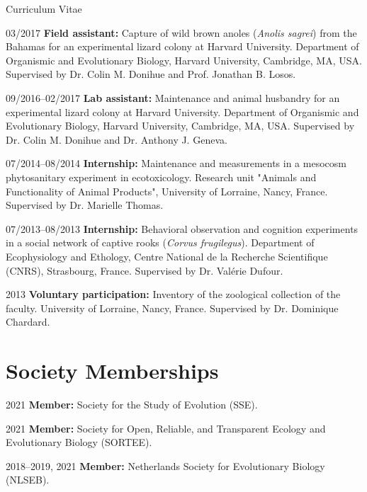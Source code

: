 \documentclass[11pt,a4paper]{article}
\begin{document}
\begin{cv}{Curriculum Vitae}
\begin{cvlist}{}
			\item[03/2017] \textbf{Field assistant:} Capture of wild brown anoles (\textit{Anolis sagrei}) from the Bahamas for an experimental lizard colony at Harvard University. Department of Organismic and Evolutionary Biology, Harvard University, Cambridge, MA, USA. Supervised by Dr. Colin M. Donihue and Prof. Jonathan B. Losos.
		
			\item[09/2016--02/2017] \textbf{Lab assistant:} Maintenance and animal husbandry for an experimental lizard colony at Harvard University. Department of Organismic and Evolutionary Biology, Harvard University, Cambridge, MA, USA. Supervised by Dr. Colin M. Donihue and Dr. Anthony J. Geneva.
		
			\item[07/2014--08/2014] \textbf{Internship:} Maintenance and measurements in a mesocosm phytosanitary experiment in ecotoxicology. Research unit "Animals and Functionality of Animal Products", University of Lorraine, Nancy, France. Supervised by Dr. Marielle Thomas.
		
			\item[07/2013--08/2013] \textbf{Internship:} Behavioral observation and cognition experiments in a social network of captive rooks (\textit{Corvus frugilegus}). Department of Ecophysiology and Ethology, Centre National de la Recherche Scientifique (CNRS), Strasbourg, France. Supervised by Dr. Valérie Dufour.
		
			\item[2013] \textbf{Voluntary participation:} Inventory of the zoological collection of the faculty. University of Lorraine, Nancy, France. Supervised by Dr. Dominique Chardard.
		
		\end{cvlist}
		
		\section{Society Memberships}
		
		\begin{cvlist}{}
			
			\item[2021] \textbf{Member:} Society for the Study of Evolution (SSE). 
			
			\item[2021] \textbf{Member:} Society for Open, Reliable, and Transparent Ecology and Evolutionary Biology (SORTEE).
			
			\item[2018--2019, 2021] \textbf{Member:} Netherlands Society for Evolutionary Biology (NLSEB).
			

\end{cvlist}
\end{cv}
\end{document}
